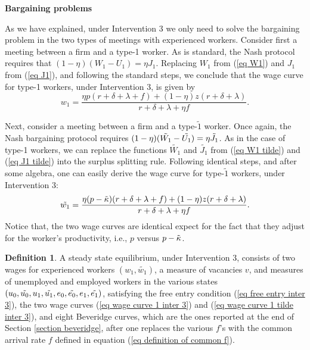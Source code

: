 \documentclass[12pt]{article} %
\theoremstyle{definition}
\newtheorem{definition}{Definition}%
\begin{document}
\bigskip 

\noindent \textbf{Bargaining problems}

\noindent As we have explained, under Intervention 3 we only need to solve the bargaining problem in the two types of meetings with experienced workers. Consider first a meeting between a firm and a type-1 worker. As is standard, the Nash protocol requires that $(1-\eta)(W_1-U_1) = \eta J_1$. Replacing $W_1$ from (\ref{eq W1}) and $J_1$ from (\ref{eq J1}), and following the standard steps, we conclude that the wage curve for type-1 workers, under Intervention 3, is given by
\begin{equation}
 w_1 = \frac{\eta p (r+\delta+\lambda+f)+(1-\eta)z(r+\delta+\lambda)}{r+\delta+\lambda + \eta f}.\label{eq wage curve 1 inter 3}    
\end{equation}

Next, consider a meeting between a firm and a type-$\tilde{1}$ worker. Once again, the Nash bargaining protocol requires $(1-\eta)(\Tilde{W_1}-\Tilde{U_1}) = \eta \Tilde{J_1}$. As in the case of type-1 workers, we can replace the functions $\tilde{W_1}$ and $\tilde{J_1}$ from (\ref{eq W1 tilde}) and (\ref{eq J1 tilde}) into the surplus splitting rule. Following identical steps, and after some algebra, one can easily derive the wage curve for type-$\tilde{1}$ workers, under Intervention 3: 
\begin{equation}
\Tilde{w_1} = \frac{\eta (p-\Tilde{\kappa}) (r+\delta+\lambda+f)+(1-\eta)z(r+\delta+\lambda)}{r+\delta +\lambda+ \eta f}.\label{eq wage curve 1 tilde inter 3}
\end{equation}Notice that, the two wage curves are identical expect for the fact that they adjust for the worker's productivity, i.e., $p$ versus $p-\Tilde{\kappa}$. 

\bigskip 

\begin{definition}\label{definition equil inter 3}
A steady state equilibrium, under Intervention 3, consists of two wages for experienced workers $(w_1, \tilde{w_1})$, a measure of vacancies $v$, and measures of unemployed and employed workers in the various states $(u_0, \Tilde{u_0}, u_1, \Tilde{u_1}, e_0, \Tilde{e_0}, e_1, \Tilde{e_1})$, satisfying the free entry condition (\ref{eq free entry inter 3}), the two wage curves (\ref{eq wage curve 1 inter 3}) and (\ref{eq wage curve 1 tilde inter 3}), and eight Beveridge curves, which are the ones reported at the end of Section \ref{section beveridge}, after one replaces the various $f$'s with the common arrival rate $f$ defined in equation (\ref{eq definition of common f}). 
\end{definition} 
\end{document}
